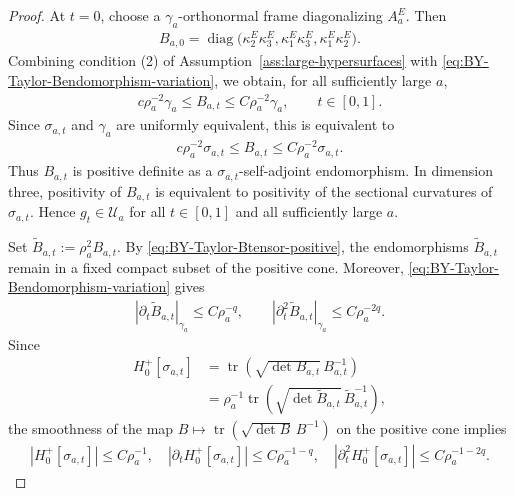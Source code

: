 \documentclass[10pt,a4paper]{amsart}
\begin{document}
\begin{proof}
		At $t=0$, choose a $\gamma_a$-orthonormal frame diagonalizing $A_a^E$.
		Then
		\begin{align*}
			B_{a,0}
			=
			\operatorname{diag}
			\bigl(
			\kappa_2^E\kappa_3^E,
			\kappa_1^E\kappa_3^E,
			\kappa_1^E\kappa_2^E
			\bigr).
		\end{align*}
		Combining condition \textup{(2)} of Assumption~\ref{ass:large-hypersurfaces} with \eqref{eq:BY-Taylor-Bendomorphism-variation}, we obtain, for all sufficiently large $a$,
		\begin{align}\label{eq:BY-Taylor-Btensor-positive}
			c\rho_a^{-2}\gamma_a
			\leq
			B_{a,t}
			\leq
			C\rho_a^{-2}\gamma_a,
			\qquad
			t\in[0,1].
		\end{align}
		Since $\sigma_{a,t}$ and $\gamma_a$ are uniformly equivalent, this is
		equivalent to
		\begin{align*}
			c\rho_a^{-2}\sigma_{a,t}
			\leq
			B_{a,t}
			\leq
			C\rho_a^{-2}\sigma_{a,t}.
		\end{align*}
		Thus $B_{a,t}$ is positive definite as a $\sigma_{a,t}$-self-adjoint
		endomorphism. In dimension three, positivity of $B_{a,t}$ is equivalent to
		positivity of the sectional curvatures of $\sigma_{a,t}$. Hence
		$g_t\in\mathcal U_a$ for all $t\in[0,1]$ and all sufficiently large $a$.
		
		Set $\widetilde B_{a,t}:=\rho_a^2B_{a,t}$. By \eqref{eq:BY-Taylor-Btensor-positive}, the endomorphisms
		$\widetilde B_{a,t}$ remain in a fixed compact subset of the positive cone.
		Moreover,
		\eqref{eq:BY-Taylor-Bendomorphism-variation} gives
		\begin{align*}
			|\partial_t\widetilde B_{a,t}|_{\gamma_a}
			\leq
			C\rho_a^{-q},
			\qquad
			|\partial_t^2\widetilde B_{a,t}|_{\gamma_a}
			\leq
			C\rho_a^{-2q}.
		\end{align*}
		Since
		\begin{align*}
			H_0^+[\sigma_{a,t}]
			&=
			\operatorname{tr}
			\left(
			\sqrt{\det B_{a,t}}\,
			B_{a,t}^{-1}
			\right)
			\\
			&=
			\rho_a^{-1}
			\operatorname{tr}
			\left(
			\sqrt{\det\widetilde B_{a,t}}\,
			\widetilde B_{a,t}^{-1}
			\right),
		\end{align*}
		the smoothness of the map
		$B\mapsto\operatorname{tr}(\sqrt{\det B}\,B^{-1})$ on the positive cone
		implies
		\begin{align}\label{eq:BY-Taylor-reference-H-variation}
			|H_0^+[\sigma_{a,t}]|
			\leq
			C\rho_a^{-1},
			\quad
			|\partial_tH_0^+[\sigma_{a,t}]|
			\leq
			C\rho_a^{-1-q},
			\quad
			|\partial_t^2H_0^+[\sigma_{a,t}]|
			\leq
			C\rho_a^{-1-2q}.
		\end{align}
		

\end{proof}
\end{document}
